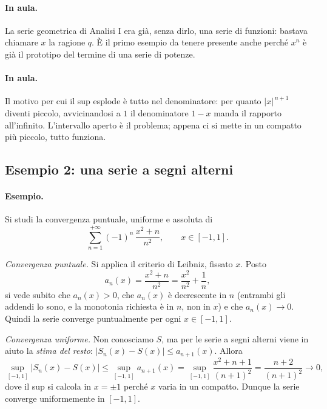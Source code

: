 \paragraph{In aula.} La serie geometrica di Analisi I era già, senza dirlo, una serie di
funzioni: bastava chiamare $x$ la ragione $q$. È il primo esempio da tenere presente anche
perché $x^n$ è già il prototipo del termine di una serie di potenze.

\paragraph{In aula.} Il motivo per cui il sup esplode è tutto nel denominatore: per quanto
$|x|^{\,n+1}$ diventi piccolo, avvicinandosi a $1$ il denominatore $1-x$ manda il rapporto
all'infinito. L'intervallo aperto è il problema; appena ci si mette in un compatto più
piccolo, tutto funziona.

\subsection{Esempio 2: una serie a segni alterni}

\paragraph{Esempio.} Si studi la convergenza puntuale, uniforme e assoluta di
\begin{equation}
\sum_{n=1}^{+\infty}(-1)^n\,\frac{x^2+n}{n^2},\qquad x\in[-1,1].
\end{equation}

\emph{Convergenza puntuale.} Si applica il criterio di Leibniz, fissato $x$. Posto
\begin{equation}
a_n(x)=\frac{x^2+n}{n^2}=\frac{x^2}{n^2}+\frac{1}{n},
\end{equation}
si vede subito che $a_n(x)>0$, che $a_n(x)$ è decrescente in $n$ (entrambi gli addendi lo
sono, e la monotonia richiesta è in $n$, non in $x$) e che $a_n(x)\to0$. Quindi la serie
converge puntualmente per ogni $x\in[-1,1]$.

\emph{Convergenza uniforme.} Non conosciamo $S$, ma per le serie a segni alterni viene in
aiuto la \emph{stima del resto}: $|S_n(x)-S(x)|\le a_{n+1}(x)$. Allora
\begin{equation}
\sup_{[-1,1]}\big|S_n(x)-S(x)\big|\le\sup_{[-1,1]}a_{n+1}(x)
=\sup_{[-1,1]}\frac{x^2+n+1}{(n+1)^2}=\frac{n+2}{(n+1)^2}\longrightarrow0,
\end{equation}
dove il sup si calcola in $x=\pm1$ perché $x$ varia in un compatto. Dunque la serie
converge uniformemente in $[-1,1]$.

